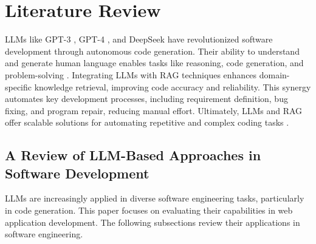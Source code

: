 \section{Literature Review}
\label{Literature Review}
LLMs like GPT-3 \citep{brown2020language}, GPT-4 \citep{sun2023gpt}, and DeepSeek \citep{guo2024deepseek} have revolutionized software development through autonomous code generation. Their ability to understand and generate human language enables tasks like reasoning, code generation, and problem-solving \citep{li2023autonomous, tupayachi2024towards}. Integrating LLMs with RAG techniques enhances domain-specific knowledge retrieval, improving code accuracy and reliability. This synergy automates key development processes, including requirement definition, bug fixing, and program repair, reducing manual effort. Ultimately, LLMs and RAG offer scalable solutions for automating repetitive and complex coding tasks \citep{meyer2023llm, baldazzi2023fine}.

\subsection{A Review of LLM-Based Approaches in Software Development}
LLMs are increasingly applied in diverse software engineering tasks, particularly in code generation. This paper focuses on evaluating their capabilities in web application development. The following subsections review their applications in software engineering.

